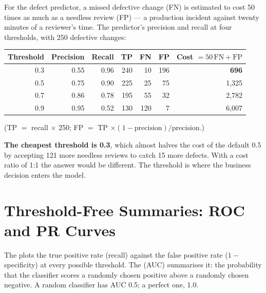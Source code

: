 \begin{worked}
For the defect predictor, a missed defective change (FN) is estimated to cost 50
times as much as a needless review (FP) --- a production incident against twenty
minutes of a reviewer's time. The predictor's precision and recall at four
thresholds, with 250 defective changes:

\smallskip
\begin{center}
\begin{tabular}{@{}rrrrrrr@{}}
\toprule
\textbf{Threshold} & \textbf{Precision} & \textbf{Recall} & \textbf{TP} & \textbf{FN} & \textbf{FP} & \textbf{Cost} $= 50\,\text{FN} + \text{FP}$ \\
\midrule
0.3 & 0.55 & 0.96 & 240 & 10 & 196 & \textbf{696} \\
0.5 & 0.75 & 0.90 & 225 & 25 & 75 & 1{,}325 \\
0.7 & 0.86 & 0.78 & 195 & 55 & 32 & 2{,}782 \\
0.9 & 0.95 & 0.52 & 130 & 120 & 7 & 6{,}007 \\
\bottomrule
\end{tabular}
\end{center}
\smallskip
(TP $=$ recall $\times$ 250; FP $=$ TP $\times (1 - \text{precision})/\text{precision}$.)

\smallskip
\textbf{The cheapest threshold is 0.3}, which almost halves the cost of the
default 0.5 by accepting 121 more needless reviews to catch 15 more defects. With
a cost ratio of 1:1 the answer would be different. The threshold is where the
business decision enters the model.
\end{worked}

\section{Threshold-Free Summaries: ROC and PR Curves}

\begin{definitionbox}
The  plots the true positive rate (recall) against the false
positive rate ($1 -$ specificity) at every possible threshold. The  (AUC) summarises it: the probability that the classifier scores
a randomly chosen positive above a randomly chosen negative. A random classifier
has AUC 0.5; a perfect one, 1.0.
\end{definitionbox}

